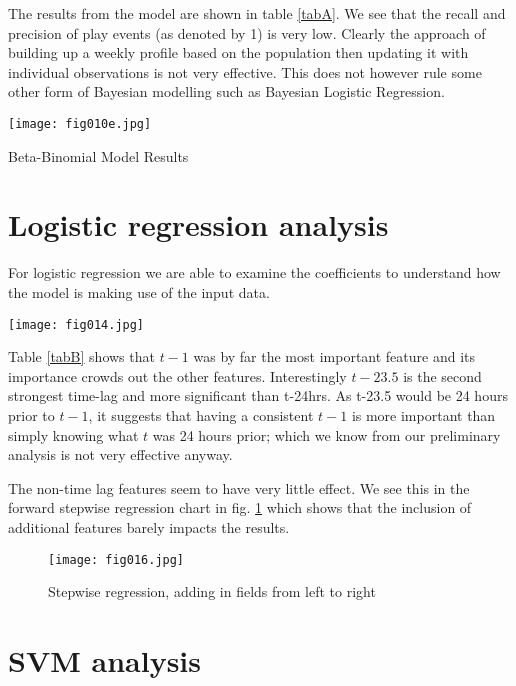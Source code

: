 The results from the model are shown in table \ref{tabA}. We see that the recall and precision of play events (as denoted by 1) is very low. Clearly the approach of building up a weekly profile based on the population then updating it with individual observations is not very effective. This does not however rule some other form of Bayesian modelling such as Bayesian Logistic Regression.

\begin{table}[h!]
	\centering
	\texttt{[image: fig010e.jpg]}
	\caption{Beta-Binomial Model Results}
	\label{tabA}
\end{table} 

\section{Logistic regression analysis}

For logistic regression we are able to examine the coefficients to understand how the model is making use of the input data.

\begin{table}[h!]
	\centering
	\texttt{[image: fig014.jpg]}
	\caption{}
	\label{tabB}
\end{table} 

Table \ref{tabB} shows that $t-1$ was by far the most important feature and its importance crowds out the other features. Interestingly $t-23.5$ is the second strongest time-lag and more significant than t-24hrs. As t-23.5 would be 24 hours prior to $t-1$, it suggests that having a consistent $t-1$ is more important than simply knowing what $t$ was 24 hours prior; which we know from our preliminary analysis is not very effective anyway.

The non-time lag features seem to have very little effect. We see this in the forward stepwise regression chart in fig. \ref{fig16} which shows that the inclusion of additional features barely impacts the results.

\begin{figure}[h!]
	\centering
	\texttt{[image: fig016.jpg]}
	\caption{Stepwise regression, adding in fields from left to right}
	\label{fig16}
\end{figure} 

\section{SVM analysis}

